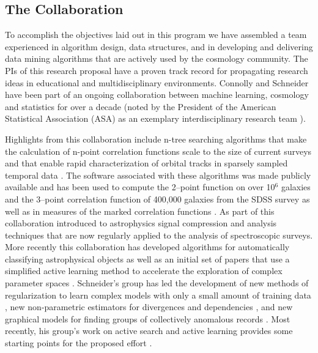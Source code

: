 \documentclass[prd,nofootbib,floatfix,11pt,tightenlines]{revtex4}
\begin{document}
\subsection{The Collaboration}

To accomplish the objectives laid out in this program we have
assembled a team experienced in algorithm design, data structures, and
in developing and delivering data mining algorithms that are actively
used by the cosmology community. The PIs of this research proposal
have a proven track record for propagating research ideas in
educational and multidisciplinary environments. Connolly and Schneider
have been part of an ongoing collaboration between machine learning,
cosmology and statistics for over a decade (noted by the President
of the American Statistical Association (ASA) as an exemplary
interdisciplinary research team \cite{straf03}).

Highlights from this collaboration include n-tree searching algorithms that
make the calculation of n-point correlation functions scale to the size of
current surveys \cite{GrayMoore} and that enable rapid characterization of
orbital tracks in sparsely sampled temporal data \cite{kubica}. The
software associated with these algorithms was made publicly available and
has been used to compute the 2--point function on over 10$^6$ galaxies and
the 3--point correlation function of 400,000 galaxies from the SDSS survey
\cite{Scranton2002,Szapudi2002,Nichol2006,mcbride2011a,mcbride2011b} as
well as in measures of the marked correlation functions \cite{Skibba2006}.
As part of this collaboration \cite{yip2004a, vdp2009, daniel2011}
introduced to astrophysics signal compression and analysis techniques that
are now regularly applied to the analysis of spectroscopic surveys. More
recently this collaboration has developed algorithms for automatically
classifying astrophysical objects \cite{vdp2009,daniel2011} as well as an
initial set of papers that use a simplified active learning method to
accelerate the exploration of complex parameter spaces \cite{daniel2012}.
Schneider's group has led the development of new methods of regularization
to learn complex models with only a small amount of training data
\cite{YiZhangICML2010,YiZhangSDM2010,YiZhangMultitask2010,YiZhang2011multiECOC,YiZhang2012},
new non-parametric estimators for divergences and dependencies
\cite{poczos11alphadiv,Poczos2011UAI,poczos12CVPR}, and new graphical
models for finding groups of collectively anomalous records
\cite{Xiong2011gad,xiong2011fgm}.  Most recently, his group's work on
active search and active learning provides some starting points for the
proposed effort \cite{Tesch13,Wang13,Sutherland13,Garnett12}.
 
\end{document}
